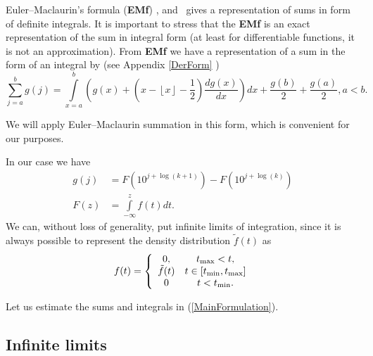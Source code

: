\documentclass[titlepage,fleqn]{article}%
\begin{document}
\label{EulerMaclaurin}%
Euler--Maclaurin's formula (\textbf{EMf})%
\cite{knuth} ,\cite{wabramowitzstegun}
and \cite{knuth2}%
\ gives a representation of sums in form of definite integrals. It is
important to stress that the \textbf{EMf} is an exact representation of the
sum in integral form (at least for differentiable functions, it is not an
approximation). From \textbf{EMf} we have a representation of a sum in the
form of an integral by (see Appendix
\ref{DerForm}%
)\
\begin{equation}%
{\displaystyle\sum\limits_{j=a}^{b}}
g(j)=%
{\displaystyle\int\limits_{x=a}^{b}}
\left(  g(x)+\left(  x-\left\lfloor x\right\rfloor -\frac{1}{2}\right)
\frac{dg(x)}{dx}\right)  dx+\frac{g(b)}{2}+\frac{g(a)}{2},a<b. \label{EM00}%
\end{equation}


We will apply Euler--Maclaurin summation in this form, which is convenient for
our purposes.

In our case we have%
\begin{align*}
g(j)  &  =F(10^{j+\log(k+1)})-F(10^{j+\log(k)})\\
F(z)  &  =%
{\displaystyle\int\limits_{-\infty}^{z}}
f(t)dt.
\end{align*}
We can, without loss of generality, put infinite limits of integration, since
it is always possible to represent the density distribution $\tilde{f}(t)$ as%
\begin{equation}
f(t)=\left\{
\begin{array}
[c]{cc}%
0, & t_{\max}<t,\\
\tilde{f}(t) & t\in\lbrack t_{\min},t_{\max}]\\
0 & t<t_{\min}.
\end{array}
\right.  \label{EM00x}%
\end{equation}


Let us estimate the sums and integrals in (\ref{MainFormulation}).

\subsection{Infinite limits}%
\end{document}
